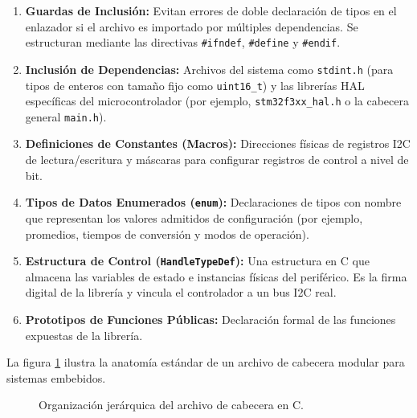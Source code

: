 \documentclass[
10pt, %
a4paper, %
oneside, %
headinclude,footinclude, %
BCOR5mm, %
]{scrartcl}
\begin{document}
\begin{enumerate}
	\item \textbf{Guardas de Inclusión:} Evitan errores de doble declaración de tipos en el enlazador si el archivo es importado por múltiples dependencias. Se estructuran mediante las directivas \texttt{\#ifndef}, \texttt{\#define} y \texttt{\#endif}.
	\item \textbf{Inclusión de Dependencias:} Archivos del sistema como \texttt{stdint.h} (para tipos de enteros con tamaño fijo como \texttt{uint16\_t}) y las librerías HAL específicas del microcontrolador (por ejemplo, \texttt{stm32f3xx\_hal.h} o la cabecera general \texttt{main.h}).
	\item \textbf{Definiciones de Constantes (Macros):} Direcciones físicas de registros I2C de lectura/escritura y máscaras para configurar registros de control a nivel de bit.
	\item \textbf{Tipos de Datos Enumerados (\texttt{enum}):} Declaraciones de tipos con nombre que representan los valores admitidos de configuración (por ejemplo, promedios, tiempos de conversión y modos de operación).
	\item \textbf{Estructura de Control (\texttt{HandleTypeDef}):} Una estructura en C que almacena las variables de estado e instancias físicas del periférico. Es la firma digital de la librería y vincula el controlador a un bus I2C real.
	\item \textbf{Prototipos de Funciones Públicas:} Declaración formal de las funciones expuestas de la librería.
\end{enumerate}

La figura \ref{fig_arbol_h} ilustra la anatomía estándar de un archivo de cabecera modular para sistemas embebidos.

\begin{figure}[H]
	\centering
	\begin{minipage}{0.9\textwidth}
	\end{minipage}
	\caption{Organización jerárquica del archivo de cabecera en C.}\label{fig_arbol_h}
\end{figure}
\end{document}
